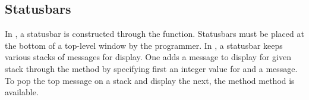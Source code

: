 






\subsection{Statusbars}
\label{sec:RGtk2:statusbars}


In \GTK, a statusbar is constructed through the
 function. Statusbars must be placed at the
bottom of a top-level window by the programmer. In \GTK, a statusbar
keeps various stacks of messages for display. One adds a message to
display for given stack through the  method
by specifying first an integer value for  and a
message. To pop the top message on a stack and display the next, the
method  method is available.

